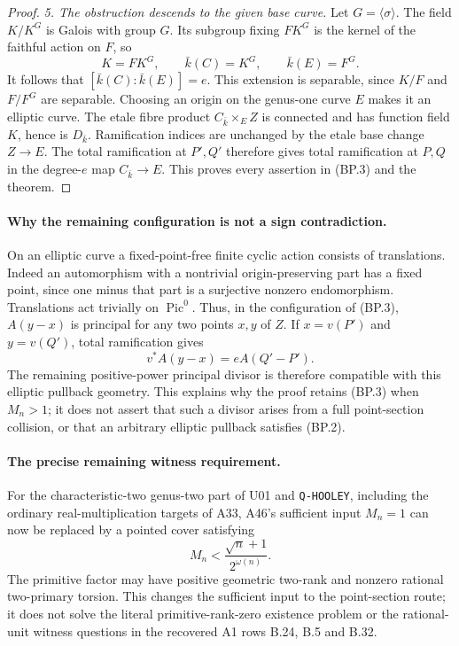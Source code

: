 \documentclass[11pt,a4paper]{article}
\begin{document}
\begin{proof}
\emph{5. The obstruction descends to the given base curve.}
Let $G=\langle\sigma\rangle$.
The field $K/K^G$ is Galois with group $G$. Its subgroup fixing
$FK^G$ is the kernel of the faithful action on $F$, so
\[
             K=FK^G,\qquad \bar k(C)=K^G,
                 \qquad \bar k(E)=F^G.
 \tag{BP.13}
\]
It follows that $[\bar k(C):\bar k(E)]=e$. This extension is
separable, since $K/F$ and $F/F^G$ are separable. Choosing an
origin on the genus-one curve $E$ makes it an elliptic curve.
The etale fibre product $C_{\bar k}\times_E Z$ is connected
and has function field $K$, hence is $D_{\bar k}$.
Ramification indices are unchanged by the etale base change
$Z\to E$. The total ramification at $P',Q'$ therefore gives
total ramification at $P,Q$ in the degree-$e$ map $C_{\bar k}\to E$.
This proves every assertion in (BP.3) and the theorem.
\end{proof}

\paragraph{Why the remaining configuration is not a sign contradiction.}
On an elliptic curve a fixed-point-free finite cyclic action
consists of translations. Indeed an automorphism with a nontrivial
origin-preserving part has a fixed point, since one minus that
part is a surjective nonzero endomorphism. Translations act
trivially on $\operatorname{Pic}^0$. Thus, in the configuration
of (BP.3), $A(y-x)$ is principal for any two points $x,y$ of
$Z$. If $x=v(P')$ and $y=v(Q')$, total ramification gives
\[
                   v^*A(y-x)=eA(Q'-P').
 \tag{BP.14}
\]
The remaining positive-power principal divisor is therefore
compatible with this elliptic pullback geometry. This explains
why the proof retains (BP.3) when $M_n>1$; it does not assert
that such a divisor arises from a full point-section collision,
or that an arbitrary elliptic pullback satisfies (BP.2).

\paragraph{The precise remaining witness requirement.}
For the characteristic-two genus-two part of U01 and
\texttt{Q-HOOLEY}, including the ordinary real-multiplication
targets of A33, A46's sufficient input $M_n=1$ can now be
replaced by a pointed cover satisfying
\[
                 M_n<\frac{\sqrt n+1}{2^{\omega(n)}}.
 \tag{BP.15}
\]
The primitive factor may have positive geometric two-rank and
nonzero rational two-primary torsion. This changes the sufficient
input to the point-section route; it does not solve the literal
primitive-rank-zero existence problem or the rational-unit
witness questions in the recovered A1 rows B.24, B.5 and B.32.
\end{document}
